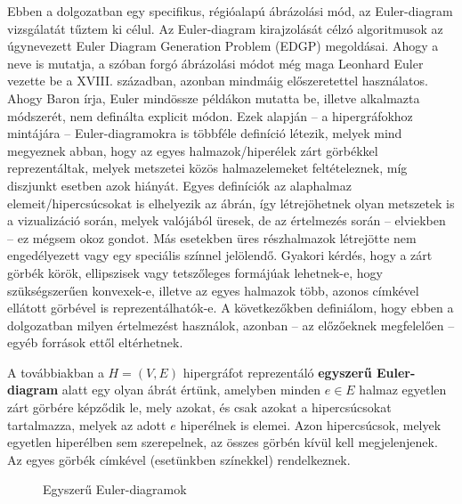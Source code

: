 Ebben a dolgozatban egy specifikus, régióalapú ábrázolási mód, az Euler-diagram vizsgálatát tűztem ki célul. Az Euler-diagram kirajzolását célzó algoritmusok az úgynevezett Euler Diagram Generation Problem (EDGP) megoldásai. Ahogy a neve is mutatja, a szóban forgó ábrázolási módot még maga Leonhard Euler vezette be a XVIII. században, azonban mindmáig előszeretettel használatos. Ahogy Baron írja\cite{euler_early}, Euler mindössze példákon mutatta be, illetve alkalmazta módszerét, nem definálta explicit módon. Ezek alapján -- a hipergráfokhoz mintájára -- Euler-diagramokra is többféle definíció létezik, melyek mind megyeznek abban, hogy az egyes halmazok/hiperélek zárt görbékkel reprezentáltak, melyek metszetei közös halmazelemeket feltételeznek, míg diszjunkt esetben azok hiányát. Egyes definíciók az alaphalmaz elemeit/hipercsúcsokat is elhelyezik az ábrán, így létrejöhetnek olyan metszetek is a vizualizáció során, melyek valójából üresek, de az értelmezés során -- elviekben -- ez mégsem okoz gondot. Más esetekben üres részhalmazok létrejötte nem engedélyezett vagy egy speciális színnel jelölendő. Gyakori kérdés, hogy a zárt görbék körök, ellipszisek vagy tetszőleges formájúak lehetnek-e, hogy szükségszerűen konvexek-e, illetve az egyes halmazok több, azonos címkével ellátott görbével is reprezentálhatók-e. A következőkben definiálom, hogy ebben a dolgozatban milyen értelmezést használok, azonban -- az előzőeknek megfelelően -- egyéb források ettől eltérhetnek.

\begin{definition}
A továbbiakban a $H=(V,E)$ hipergráfot reprezentáló \textbf{egyszerű Euler-diagram} alatt egy olyan ábrát értünk, amelyben minden $e \in E$ halmaz egyetlen zárt görbére képződik le, mely azokat, és csak azokat a hipercsúcsokat tartalmazza, melyek az adott $e$ hiperélnek is elemei. Azon hipercsúcsok, melyek egyetlen hiperélben sem szerepelnek, az összes görbén kívül kell megjelenjenek. Az egyes görbék címkével (esetünkben színekkel) rendelkeznek.
\end{definition}

\begin{figure}[H]
	\centering
	\hspace{5pt}
	\caption{Egyszerű Euler-diagramok}
	\label{fig:euler_simple}
\end{figure}

